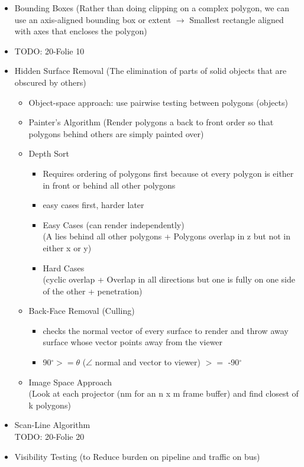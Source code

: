 \documentclass[11pt,a4paper]{article}
\begin{document}
\begin{itemize}
			\item Bounding Boxes (Rather than doing clipping on a complex polygon, we can use an axis-aligned bounding box or extent $\rightarrow$ Smallest rectangle aligned with axes that encloses the
			polygon)
			\item TODO: 20-Folie 10
			\item Hidden Surface Removal (The elimination of parts of solid objects that are obscured by others)
				\begin{itemize}
					\item Object-space approach: use pairwise testing between polygons (objects)
					\item Painter’s Algorithm (Render polygons a back to front order so that polygons behind others are simply painted over)
					\item Depth Sort
						\begin{itemize}
							\item Requires ordering of polygons first because ot every polygon is either in front or behind all other polygons
							\item easy cases first, harder later
							\item Easy Cases (can render independently)\\
							(A lies behind all other polygons + Polygons overlap in z but not in either x or y)
							\item Hard Cases\\
							(cyclic overlap + Overlap in all directions but one is fully on one side of the other + penetration)
						\end{itemize}
					\item Back-Face Removal (Culling)
						\begin{itemize}
							\item checks the normal vector of every surface to render and throw away surface whose vector points away from the viewer
							\item 90$^\circ >= \theta$ ($\angle$ normal and vector to viewer)  $>=$ -90$^\circ$
						\end{itemize}
					\item Image Space Approach\\
					(Look at each projector (nm for an n x m frame buffer) and find closest of k polygons)
				\end{itemize}
			\item Scan-Line Algorithm\\
			TODO: 20-Folie 20
			\item Visibility Testing (to Reduce burden on pipeline and traffic on bus)

\end{itemize}
\end{document}
